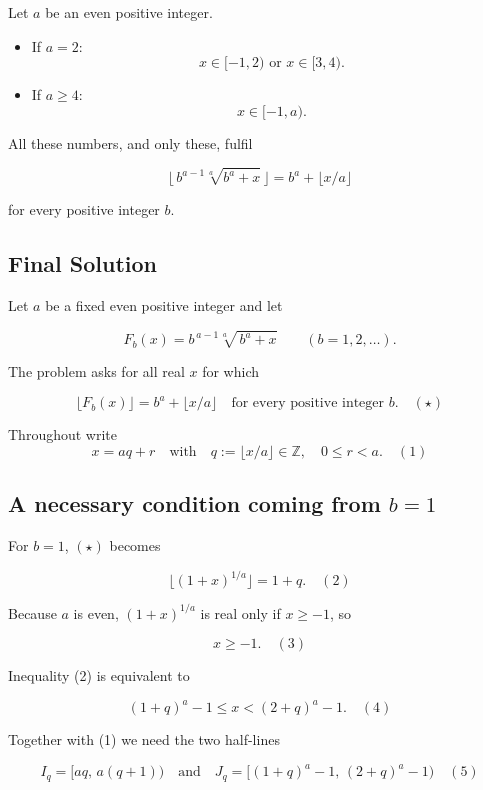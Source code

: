 \documentclass[12pt,a4paper]{article}
\theoremstyle{definition}
\begin{document}
        Let $a$ be an even positive integer.

        \begin{itemize}
            \item If $a = 2$:
            $$x \in [-1,2) \text{ or } x \in [3,4).$$

            \item If $a \geq 4$:
            $$x \in [-1, a).$$
        \end{itemize}

        All these numbers, and only these, fulfil

        $$\lfloor\,b^{a-1}\sqrt[a]{b^{a}+x}\,\rfloor = b^{a}+\lfloor x/a\rfloor$$

        for every positive integer $b$.


\subsection{Final Solution}
        Let $a$ be a fixed even positive integer and let

        $$F_b(x)=b^{\,a-1}\sqrt[a]{\,b^{a}+x}\qquad(b=1,2,\dots ).$$

        The problem asks for all real $x$ for which

        $$\lfloor F_b(x)\rfloor = b^{a}+\lfloor x/a\rfloor\quad\text{for every positive integer } b.\quad(\star)$$

        Throughout write
        $$x=aq+r\quad\text{with}\quad q:=\lfloor x/a\rfloor\in\mathbb{Z},\quad 0\leq r<a.\quad(1)$$

        \subsection*{A necessary condition coming from $b = 1$}

        For $b=1$, $(\star)$ becomes

        $$\lfloor(1+x)^{1/a}\rfloor = 1+q.\quad(2)$$

        Because $a$ is even, $(1+x)^{1/a}$ is real only if $x\geq-1$, so

        $$x \geq -1.\quad(3)$$

        Inequality (2) is equivalent to

        $$(1+q)^a - 1 \leq x < (2+q)^a - 1.\quad(4)$$

        Together with (1) we need the two half-lines

        $$I_q =[aq,\,a(q+1))\quad\text{and}\quad J_q=[(1+q)^a-1,\,(2+q)^a-1)\quad(5)$$
\end{document}

